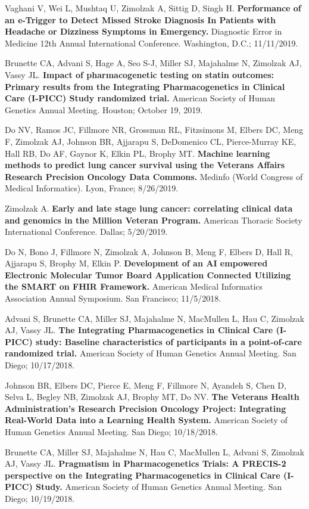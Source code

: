 \documentclass[10pt]{article}
\begin{document}
Vaghani V, Wei L, Mushtaq U, Zimolzak A, Sittig D, Singh H.
\textbf{Performance of an e-Trigger to Detect Missed Stroke Diagnosis
  In Patients with Headache or Dizziness Symptoms in Emergency.}
Diagnostic Error in Medicine 12th Annual International Conference.
Washington, D.C.; 11/11/2019.

Brunette CA, Advani S, Hage A, Seo S-J, Miller SJ, Majahalme N,
Zimolzak AJ, Vassy JL. \textbf{Impact of pharmacogenetic testing on
  statin outcomes: Primary results from the Integrating
  Pharmacogenetics in Clinical Care (I-PICC) Study randomized trial.}
American Society of Human Genetics Annual Meeting. Houston; October
19, 2019.

Do NV, Ramos JC, Fillmore NR, Grossman RL, Fitzsimons M, Elbers DC,
Meng F, Zimolzak AJ, Johnson BR, Ajjarapu S, DeDomenico CL,
Pierce-Murray KE, Hall RB, Do AF, Gaynor K, Elkin PL, Brophy MT.
\textbf{Machine learning methods to predict lung cancer survival using
  the Veterans Affairs Research Precision Oncology Data Commons.}
Medinfo (World Congress of Medical Informatics). Lyon, France;
8/26/2019.

Zimolzak A. \textbf{Early and late stage lung cancer: correlating
  clinical data and genomics in the Million Veteran Program.} American
Thoracic Society International Conference. Dallas; 5/20/2019.

Do N, Bono J, Fillmore N, Zimolzak A, Johnson B, Meng F, Elbers D,
Hall R, Ajjarapu S, Brophy M, Elkin P. \textbf{Development of an AI
  empowered Electronic Molecular Tumor Board Application Connected
  Utilizing the SMART on FHIR Framework.} American Medical Informatics
Association Annual Symposium. San Francisco; 11/5/2018.

Advani S, Brunette CA, Miller SJ, Majahalme N, MacMullen L, Hau C,
Zimolzak AJ, Vassy JL. \textbf{The Integrating Pharmacogenetics in
  Clinical Care (I-PICC) study: Baseline characteristics of
  participants in a point-of-care randomized trial.} American Society
of Human Genetics Annual Meeting. San Diego; 10/17/2018.

Johnson BR, Elbers DC, Pierce E, Meng F, Fillmore N, Ayandeh S, Chen
D, Selva L, Begley NB, Zimolzak AJ, Brophy MT, Do NV. \textbf{The
  Veterans Health Administration's Research Precision Oncology
  Project: Integrating Real-World Data into a Learning Health System.}
American Society of Human Genetics Annual Meeting. San Diego;
10/18/2018.

Brunette CA, Miller SJ, Majahalme N, Hau C, MacMullen L, Advani S,
Zimolzak AJ, Vassy JL. \textbf{Pragmatism in Pharmacogenetics Trials:
  A PRECIS-2 perspective on the Integrating Pharmacogenetics in
  Clinical Care (I-PICC) Study.} American Society of Human Genetics
Annual Meeting. San Diego; 10/19/2018.
\end{document}
